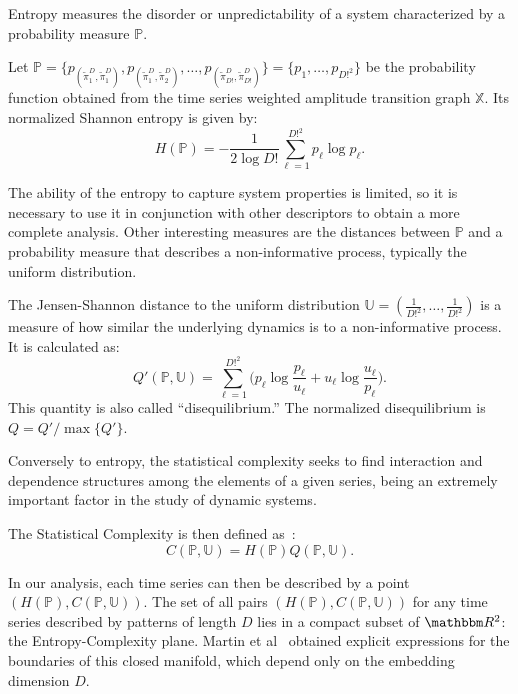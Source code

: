 \documentclass[journal]{IEEEtran}
\begin{document}
Entropy measures the disorder or unpredictability of a system characterized by a probability measure $\mathbb{P}$.

Let $\mathbb{P} = \{p_{(\widetilde\pi^D_1, \widetilde\pi^D_1)}, p_{(\widetilde\pi^D_1, \widetilde\pi^D_2)}, \dots, p_{(\widetilde\pi^D_{D!}, \widetilde\pi^D_{D!})} \} = \{p_1,\dots,p_{D!^2}\}$ be the probability function obtained from the time series weighted amplitude transition graph $\mathbb{X}$.
Its normalized Shannon entropy is given by:	
\begin{equation}
H(\mathbb{P}) = -\frac1{2\log D!}\sum_{\ell=1}^{D!^2} p_{\ell} \log p_{\ell} .
\label{eq:Entropia}
\end{equation}

The ability of the entropy to capture system properties is limited, so it is necessary to use it in conjunction with other des\-criptors to obtain a more complete analysis.
Other interesting measures are the distances between $\mathbb{P}$ and a probability measure that describes a non-informative process, typically the uniform distribution.

The Jensen-Shannon distance to the uniform distribution $\mathbb{U} = (\frac{1}{D!^2}, \dots, \frac{1}{D!^2})$ is a measure of how similar the underlying dynamics is to a non-informative process.
It is calculated as:
\begin{equation}
Q'(\mathbb{P}, \mathbb{U}) = \sum_{\ell=1}^{D!^2} \Big(p_\ell \log\frac{p_\ell}{u_\ell} +
u_\ell \log\frac{u_\ell}{p_\ell}
\Big).
\end{equation}
This quantity is also called ``disequilibrium.''
The normalized disequilibrium is $ Q=Q'/\max\{Q'\}$.

Conversely to entropy, the statistical complexity seeks to find interaction and dependence structures among the elements of a given series, being an extremely important factor in the study of dynamic systems.

The Statistical Complexity is then defined as~\cite{Lamberti2004Entropic}:
\begin{equation}
C(\mathbb{P}, \mathbb{U}) = H(\mathbb{P}) Q(\mathbb{P}, \mathbb{U}).
\end{equation}

In our analysis, each time series can then be described by a point $(H(\mathbb{P}), C(\mathbb{P}, \mathbb{U}))$.
The set of all pairs $(H(\mathbb{P}), C(\mathbb{P}, \mathbb{U}))$ for any time series described by patterns of length $D$ lies in a compact subset of $\mathbbm R^2$: the Entropy-Complexity plane.
Martin et al~\cite{martin2006generalized} obtained explicit expressions for the boundaries of this closed manifold, which depend only on the embedding dimension $D$.
\end{document}
